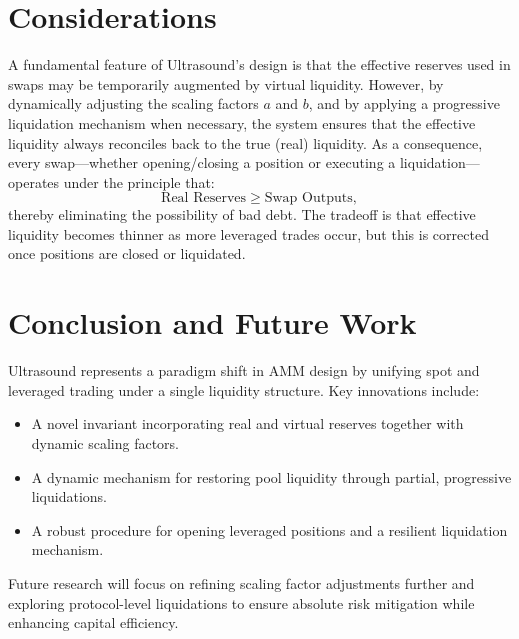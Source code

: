 \documentclass[11pt]{article}
\begin{document}
\section{Considerations}
A fundamental feature of Ultrasound's design is that the effective reserves used in swaps may be temporarily augmented by virtual liquidity. However, by dynamically adjusting the scaling factors \(a\) and \(b\), and by applying a progressive liquidation mechanism when necessary, the system ensures that the effective liquidity always reconciles back to the true (real) liquidity. As a consequence, every swap—whether opening/closing a position or executing a liquidation—operates under the principle that:
\[
\text{Real Reserves} \geq \text{Swap Outputs},
\]
thereby eliminating the possibility of bad debt. The tradeoff is that effective liquidity becomes thinner as more leveraged trades occur, but this is corrected once positions are closed or liquidated.

\section{Conclusion and Future Work}
Ultrasound represents a paradigm shift in AMM design by unifying spot and leveraged trading under a single liquidity structure. Key innovations include:
\begin{itemize}
    \item A novel invariant incorporating real and virtual reserves together with dynamic scaling factors.
    \item A dynamic mechanism for restoring pool liquidity through partial, progressive liquidations.
    \item A robust procedure for opening leveraged positions and a resilient liquidation mechanism.
\end{itemize}

Future research will focus on refining scaling factor adjustments further and exploring protocol-level liquidations to ensure absolute risk mitigation while enhancing capital efficiency.
\end{document}
